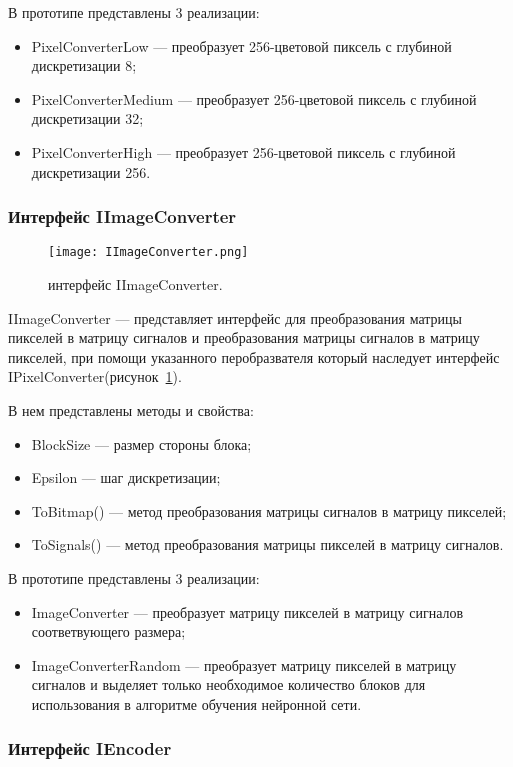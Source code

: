 В прототипе представлены 3 реализации:
\begin{itemize}
  \item PixelConverterLow --- преобразует 256-цветовой пиксель с глубиной дискретизации 8;
  \item PixelConverterMedium --- преобразует 256-цветовой пиксель с глубиной дискретизации 32;
  \item PixelConverterHigh --- преобразует 256-цветовой пиксель с глубиной дискретизации 256.
\end{itemize}

\subsubsection{Интерфейс IImageConverter}
\label{subsub:development:types:iimageconverter}

\begin{figure}[ht]
\centering
  \texttt{[image: IImageConverter.png]}
  \caption{ интерфейс IImageConverter. }
  \label{fig:iimageconverter}
\end{figure}
IImageConverter --- представляет интерфейс для преобразования матрицы пикселей в матрицу сигналов и
преобразования матрицы сигналов в матрицу пикселей, при помощи указанного перобразвателя который наследует интерфейс IPixelConverter(рисунок~\ref{fig:iimageconverter}).

В нем представлены методы и свойства:
\begin{itemize}
  \item BlockSize --- размер стороны блока;
  \item Epsilon --- шаг дискретизации;
  \item ToBitmap() --- метод преобразования матрицы сигналов в матрицу пикселей;
  \item ToSignals() --- метод преобразования матрицы пикселей в матрицу сигналов.
\end{itemize}

В прототипе представлены 3 реализации:
\begin{itemize}
  \item ImageConverter --- преобразует матрицу пикселей в матрицу сигналов соответвующего размера;
  \item ImageConverterRandom --- преобразует матрицу пикселей в матрицу сигналов и выделяет только необходимое
  количество блоков для использования в алгоритме обучения нейронной сети.
\end{itemize}

\subsubsection{Интерфейс IEncoder}
\label{subsub:development:types:iencoder}

